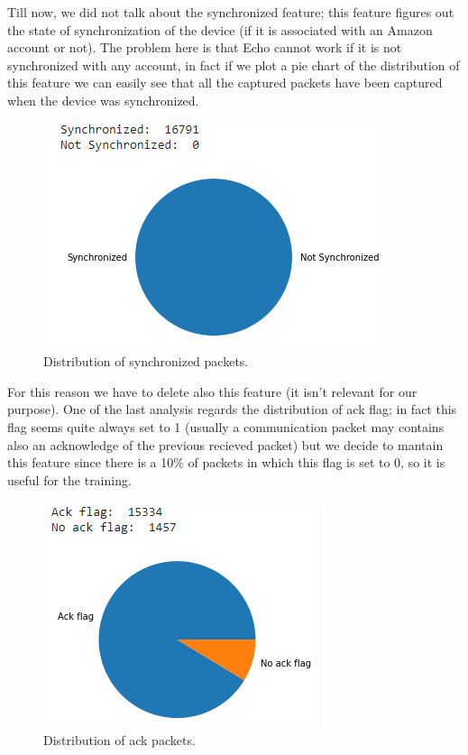 \documentclass[sigconf]{acmart}
\begin{document}
    Till now, we did not talk about the synchronized feature; this feature figures out the state of synchronization of the device (if it is associated with an Amazon account or not). The problem here is that Echo cannot work if it is not synchronized with any account, in fact if we plot a pie chart of the distribution of this feature we can easily see that all the captured packets have been captured when the device was synchronized.
    \begin{figure}[h!]
        \includegraphics[width=0.8\linewidth]{img/syn_not_syn.png}
        \caption{Distribution of synchronized packets.}
        \label{fig:syn_not_syn}
    \end{figure}

    For this reason we have to delete also this feature (it isn't relevant for our purpose). One of the last analysis regards the distribution of ack flag; in fact this flag seems quite always set to 1 (usually a communication packet may contains also an acknowledge of the previous recieved packet) but we decide to mantain this feature since there is a 10\% of packets in which this flag is set to 0, so it is useful for the training.


    \begin{figure}[h!]
        \includegraphics[width=0.8\linewidth]{img/ack_no_ack.png}
        \caption{Distribution of ack packets.}
        \label{fig:ack_not_ack}
    \end{figure}
\end{document}
